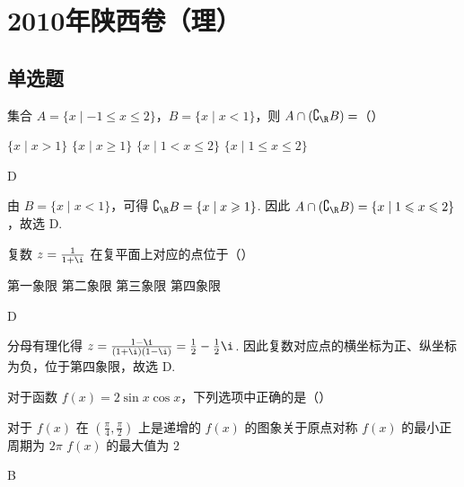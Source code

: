 \chapter{2010年陕西卷（理）}

\section{单选题}

\begin{problem}
集合 \(A = \{x \mid -1 \leqslant x \leqslant 2\}\)，\(B = \{x \mid x < 1\}\)，则 \(A \cap (\complement_{\R} B) =\)（\quad）

\choices
    {\( \{x \mid x > 1\} \)}
    {\(\{x \mid x \geqslant 1\}\)}
    {\(\{x\mid 1 < x\leqslant 2\}\)}
    {\(\{x\mid 1\leqslant x\leqslant 2\}\)}
\end{problem}

\begin{answer}
D
\end{answer}

\begin{solution}
由 \(B=\{x\mid x<1\}\)，可得 \(\complement_{\R}B=\{x\mid x\geqslant1\}\). 因此 \(A\cap(\complement_{\R}B)=\{x\mid1\leqslant x\leqslant2\}\)，故选 D.
\end{solution}

\begin{problem}
复数 \(z = \frac{1}{1 + \i}\) 在复平面上对应的点位于（\quad）

\choices
    {第一象限}
    {第二象限}
    {第三象限}
    {第四象限}
\end{problem}

\begin{answer}
D
\end{answer}

\begin{solution}
分母有理化得 \(z=\frac{1-\i}{(1+\i)(1-\i)}=\frac12-\frac12\i\). 因此复数对应点的横坐标为正、纵坐标为负，位于第四象限，故选 D.
\end{solution}

\begin{problem}
对于函数 \( f(x) = 2\sin x\cos x \)，下列选项中正确的是（\quad）

\choices
    {对于 \(f(x)\) 在 \(\left(\frac{\pi}{4}, \frac{\pi}{2}\right)\) 上是递增的}
    {\(f(x)\) 的图象关于原点对称}
    {\(f(x)\) 的最小正周期为 \(2\pi\)}
    {\(f(x)\) 的最大值为 \(2\)}
\end{problem}

\begin{answer}
B
\end{answer}

